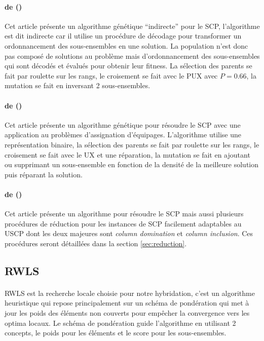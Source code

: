 \documentclass[a4paper,11pt,twoside,french,report]{../common/simplem}
\begin{document}
				\paragraph*{ de \citeauthor{Aickelin2002} (\citeyear{Aickelin2002})~\cite{Aickelin2002}\\}
					Cet article présente un algorithme génétique ``indirecte'' pour le \gls{SCP}, l'algorithme est dit indirecte car il utilise un procédure de décodage pour transformer un ordonnancement des sous-ensembles en une solution. La population n'est donc pas composé de solutions au problème mais d'ordonnancement des sous-ensembles qui sont décodés et évalués pour obtenir leur fitness. La sélection des parents se fait par roulette sur les rangs, le croisement se fait avec le \gls{PUX} avec \(P = 0.66\), la mutation se fait en inversant 2 sous-ensembles.
				\paragraph*{ de \citeauthor{Kornilakis2002} (\citeyear{Kornilakis2002})~\cite{Kornilakis2002}\\}
					Cet article présente un algorithme génétique pour résoudre le \gls{SCP} avec une application au problèmes d'assignation d'équipages. L'algorithme utilise une représentation binaire, la sélection des parents se fait par roulette sur les rangs, le croisement se fait avec le \gls{UX} et une réparation, la mutation se fait en ajoutant ou supprimant un sous-ensemble en fonction de la densité de la meilleure solution puis réparant la solution.
				\paragraph*{ de \citeauthor{Beasley1987} (\citeyear{Beasley1987})~\cite{Beasley1987}\\}
					Cet article présente un algorithme pour résoudre le \gls{SCP} mais aussi plusieurs procédures de réduction pour les instances de \gls{SCP} facilement adaptables au \gls{USCP} dont les deux majeures sont \textit{column domination} et \textit{column inclusion}. Ces procédures seront détaillées dans la section \ref{sec:reduction}.
			\subsection{\acrshort{RWLS}}\label{sec:RWLS}
				\paragraph*{}
					\gls{RWLS} est la recherche locale choisie pour notre hybridation, c'est un algorithme heuristique qui repose principalement sur un schéma de pondération qui met à jour les poids des éléments non couverts pour empêcher la convergence vers les optima locaux. Le schéma de pondération guide l'algorithme en utilisant 2 concepts, le poids pour les éléments et le score pour les sous-ensembles.
\end{document}
